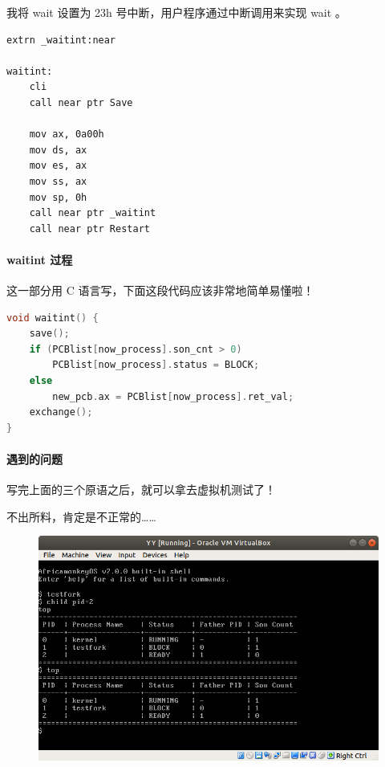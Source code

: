 \documentclass{article}
\begin{document}
我将 wait 设置为 23h 号中断，用户程序通过中断调用来实现 wait 。

\begin{lstlisting}[language={[x86masm]Assembler}]
extrn _waitint:near

waitint:
	cli
	call near ptr Save
	
	mov ax, 0a00h
	mov ds, ax
	mov es, ax
	mov ss, ax
	mov sp, 0h
	call near ptr _waitint
	call near ptr Restart
\end{lstlisting}

\paragraph{waitint 过程}

这一部分用 C 语言写，下面这段代码应该非常地简单易懂啦！

\begin{lstlisting}[language=C++]
void waitint() {
	save();
	if (PCBlist[now_process].son_cnt > 0)
		PCBlist[now_process].status = BLOCK;
	else
		new_pcb.ax = PCBlist[now_process].ret_val;
	exchange();
}
\end{lstlisting}

\paragraph{遇到的问题}

写完上面的三个原语之后，就可以拿去虚拟机测试了！

不出所料，肯定是不正常的……

\begin{figure}[!hbp]
	\centering
	\includegraphics[scale=0.55]{pics/1.png}
\end{figure}
\end{document}
